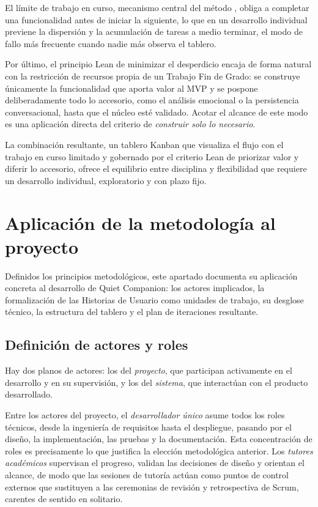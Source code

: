 El límite de trabajo en curso, mecanismo central del método \citep{Anderson2010}, obliga a completar
una funcionalidad antes de iniciar la siguiente, lo que en un desarrollo individual previene la dispersión y
la acumulación de tareas a medio terminar, el modo de fallo más frecuente cuando nadie más observa el
tablero.

Por último, el principio Lean de minimizar el desperdicio encaja de forma natural con la
restricción de recursos propia de un Trabajo Fin de Grado: se construye únicamente la funcionalidad que
aporta valor al MVP y se pospone deliberadamente todo lo accesorio, como el análisis emocional o la
persistencia conversacional, hasta que el núcleo esté validado. Acotar el alcance de este modo es una
aplicación directa del criterio de \textit{construir solo lo necesario}.

La combinación resultante, un tablero Kanban que visualiza el flujo con el trabajo en curso limitado y
gobernado por el criterio Lean de priorizar valor y diferir lo accesorio, ofrece el equilibrio entre
disciplina y flexibilidad que requiere un desarrollo individual, exploratorio y con plazo fijo.

\section{Aplicación de la metodología al proyecto}

Definidos los principios metodológicos, este apartado documenta su aplicación concreta al desarrollo de
Quiet Companion: los actores implicados, la formalización de las Historias de Usuario como unidades de
trabajo, su desglose técnico, la estructura del tablero y el plan de iteraciones resultante.

\subsection{Definición de actores y roles}

Hay dos planos de actores: los del \textit{proyecto}, que participan activamente en el
desarrollo y en su supervisión, y los del \textit{sistema}, que interactúan con el producto desarrollado.

Entre los actores del proyecto, el \textit{desarrollador único} asume todos los roles técnicos, desde la
ingeniería de requisitos hasta el despliegue, pasando por el diseño, la implementación, las pruebas y la
documentación. Esta concentración de roles es precisamente lo que justifica la elección metodológica
anterior. Los \textit{tutores académicos} supervisan el progreso, validan las decisiones de diseño y
orientan el alcance, de modo que las sesiones de tutoría actúan como puntos de control externos que
sustituyen a las ceremonias de revisión y retrospectiva de Scrum, carentes de sentido en solitario.

